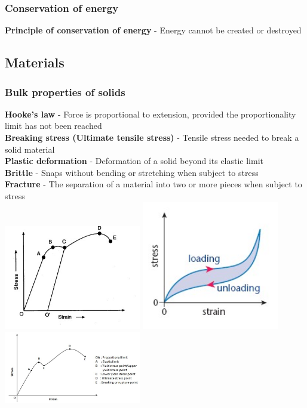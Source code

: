 \documentclass[12pt]{article}
\begin{document}
\subsubsection{Conservation of energy}
\textbf{Principle of conservation of energy} - Energy cannot be created or destroyed
\subsection{Materials}
\subsubsection{Bulk properties of solids}
\textbf{Hooke's law} - Force is proportional to extension, provided the proportionality limit has not been reached\\
\textbf{Breaking stress (Ultimate tensile stress)} - Tensile stress needed to break a solid material\\
\textbf{Plastic deformation} - Deformation of a solid beyond its elastic limit\\
\textbf{Brittle} - Snaps without bending or stretching when subject to stress\\
\textbf{Fracture} - The separation of a material into two or more pieces when subject to stress\\
\includegraphics[width=6cm]{metal.jpg}
\includegraphics[width=6cm]{rubber.jpg}
\includegraphics[width=6cm]{Stress_Strain.jpg}
\end{document}
